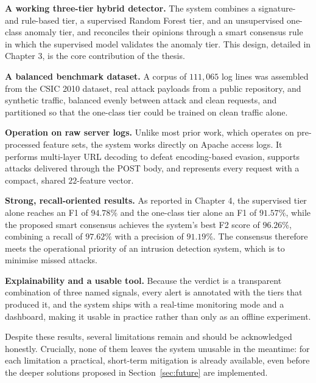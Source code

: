 \documentclass[../main.tex]{subfiles}
\begin{document}
\begin{romanlist}
  \item \textbf{A working three-tier hybrid detector.} The system combines a
        signature- and rule-based tier, a supervised Random Forest tier, and
        an unsupervised one-class anomaly tier, and reconciles their opinions
        through a smart consensus rule in which the supervised model
        validates the anomaly tier. This design, detailed in
        Chapter 3, is the core contribution of the thesis.
  \item \textbf{A balanced benchmark dataset.} A corpus of $111{,}065$ log
        lines was assembled from the CSIC 2010 dataset, real attack payloads
        from a public repository, and synthetic traffic, balanced evenly
        between attack and clean requests, and partitioned so that the
        one-class tier could be trained on clean traffic alone.
  \item \textbf{Operation on raw server logs.} Unlike most prior work, which
        operates on pre-processed feature sets, the system works directly on
        Apache access logs. It performs multi-layer URL decoding to defeat
        encoding-based evasion, supports attacks delivered through the POST
        body, and represents every request with a compact, shared
        $22$-feature vector.
  \item \textbf{Strong, recall-oriented results.} As reported in
        Chapter 4, the supervised tier alone reaches an F1
        of $94.78\%$ and the one-class tier alone an F1 of $91.57\%$, while
        the proposed smart consensus achieves the system's best F2 score of
        $96.26\%$, combining a recall of $97.62\%$ with a precision of
        $91.19\%$. The consensus therefore meets the operational priority of
        an intrusion detection system, which is to minimise missed attacks.
  \item \textbf{Explainability and a usable tool.} Because the verdict is a
        transparent combination of three named signals, every alert is
        annotated with the tiers that produced it, and the system ships with
        a real-time monitoring mode and a dashboard, making it usable in
        practice rather than only as an offline experiment.
\end{romanlist}

Despite these results, several limitations remain and should be acknowledged
honestly. Crucially, none of them leaves the system unusable in the meantime:
for each limitation a practical, short-term mitigation is already available,
even before the deeper solutions proposed in Section~\ref{sec:future} are
implemented.
\end{document}
